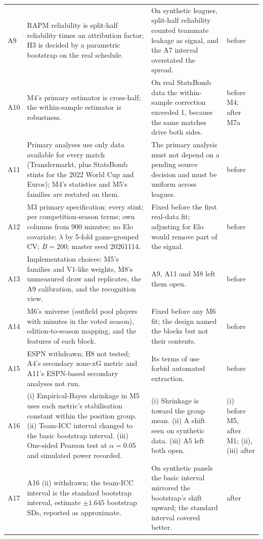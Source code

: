 \documentclass[11pt,a4paper]{article}
\begin{document}
{\begin{longtable}{@{}L{0.7cm}L{6.9cm}L{4.6cm}L{2.1cm}@{}}
A9 & RAPM reliability is split-half reliability times an attribution factor; H3 is decided by a parametric bootstrap on the real schedule. & On synthetic leagues, split-half reliability counted teammate leakage as signal, and the A7 interval overstated the spread. & before \\
A10 & M4's primary estimator is cross-half; the within-sample estimator is robustness. & On real StatsBomb data the within-sample correction exceeded 1, because the same matches drive both sides. & before M4; after M7a \\
A11 & Primary analyses use only data available for every match (Transfermarkt, plus StatsBomb stints for the 2022 World Cup and Euros); M4's statistics and M5's families are restated on them. & The primary analysis must not depend on a pending source decision and must be uniform across leagues. & before \\
A12 & M3 primary specification: every stint; per competition-season terms; own columns from 900 minutes; no Elo covariate; $\lambda$ by 5-fold game-grouped CV; $B = 200$; master seed 20261114. & Fixed before the first real-data fit; adjusting for Elo would remove part of the signal. & before \\
A13 & Implementation choices: M5's families and V1-like weights, M8's unmeasured draw and replicates, the A9 calibration, and the recognition view. & A9, A11 and M8 left them open. & before \\
A14 & M6's universe (outfield pool players with minutes in the voted season), edition-to-season mapping, and the features of each block. & Fixed before any M6 fit; the design named the blocks but not their contents. & before \\
A15 & ESPN withdrawn; H8 not tested; A4's secondary zone-xG metric and A11's ESPN-based secondary analyses not run. & Its terms of use forbid automated extraction. & before \\
A16 & (i) Empirical-Bayes shrinkage in M5 uses each metric's stabilisation constant within the position group. (ii) Team-ICC interval changed to the basic bootstrap interval. (iii) One-sided Pearson test at $\alpha = 0.05$ and simulated power recorded. & (i) Shrinkage is toward the group mean. (ii) A shift seen on synthetic data. (iii) A5 left both open. & (i) before M5, after M1; (ii), (iii) after \\
A17 & A16 (ii) withdrawn; the team-ICC interval is the standard bootstrap interval, estimate $\pm 1.645$ bootstrap SDs, reported as approximate. & On synthetic panels the basic interval mirrored the bootstrap's shift upward; the standard interval covered better. & after \\

\end{longtable}}
\end{document}
